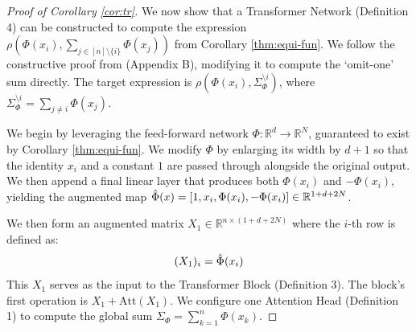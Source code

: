 \documentclass[twoside,11pt]{article}
\newcommand{\RR}{\mathbb{R}}
\begin{document}
\begin{proof}[Proof of Corollary \ref{cor:tr}]
We now show that a Transformer Network (Definition 4) can be constructed to compute the expression $\rho\left(\Phi(x_i),\sum_{j\in [n]\setminus \{i\}}\Phi(x_j)\right)$ from Corollary \ref{thm:equi-fun}. We follow the constructive proof from \cite{Sumformer} (Appendix B), modifying it to compute the `omit-one' sum directly. The target expression is $ \rho(\Phi(x_i), \Sigma_{\Phi}^{\setminus i})$, where $\Sigma_{\Phi}^{\setminus i} = \sum_{j \neq i} \Phi(x_j)$. 


We begin by leveraging the feed-forward network $\Phi: \RR^d \rightarrow \RR^N$, guaranteed to exist by Corollary \ref{thm:equi-fun}. We modify $\Phi$ by enlarging its width by $d+1$ so that the identity $x_i$ and a constant $1$ are passed through alongside the original output. We then append a final linear layer that produces both $\Phi(x_i)$ and $-\Phi(x_i)$, yielding the augmented map $\Hat{\Phi}(x) = [1, x_i, \Phi(x_i), - \Phi(x_i)] \in \RR^{1+d + 2N}$.



We then form an augmented matrix $X_1 \in \RR^{n \times (1+d+2N)}$ where the $i$-th row is defined as:
$$ (X_1)_i = \Hat{\Phi}(x_i) $$
This $X_1$ serves as the input to the Transformer Block (Definition 3). The block's first operation is $X_1 + \text{Att}(X_1)$. We configure one Attention Head (Definition 1) to compute the global sum $\Sigma_{\Phi} = \sum_{k=1}^n \Phi(x_k)$.


\end{proof}
\end{document}
